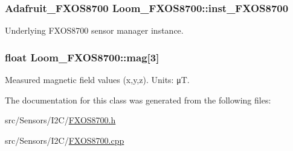 \subsubsection[{\texorpdfstring{inst\+\_\+\+F\+X\+O\+S8700}{inst_FXOS8700}}]{\setlength{\rightskip}{0pt plus 5cm}Adafruit\+\_\+\+F\+X\+O\+S8700 Loom\+\_\+\+F\+X\+O\+S8700\+::inst\+\_\+\+F\+X\+O\+S8700\hspace{0.3cm}{\ttfamily [protected]}}\hypertarget{class_loom___f_x_o_s8700_ad3ff453ce86ac6fb61d8109b89877f7b}{}\label{class_loom___f_x_o_s8700_ad3ff453ce86ac6fb61d8109b89877f7b}


Underlying F\+X\+O\+S8700 sensor manager instance. 

\subsubsection[{\texorpdfstring{mag}{mag}}]{\setlength{\rightskip}{0pt plus 5cm}float Loom\+\_\+\+F\+X\+O\+S8700\+::mag\mbox{[}3\mbox{]}\hspace{0.3cm}{\ttfamily [protected]}}\hypertarget{class_loom___f_x_o_s8700_af4ac468c842d26be3d1ef3ed3a67644f}{}\label{class_loom___f_x_o_s8700_af4ac468c842d26be3d1ef3ed3a67644f}


Measured magnetic field values (x,y,z). Units\+: μT. 



The documentation for this class was generated from the following files\+:\begin{DoxyCompactItemize}
\item 
src/\+Sensors/\+I2\+C/\hyperlink{_f_x_o_s8700_8h}{F\+X\+O\+S8700.\+h}\item 
src/\+Sensors/\+I2\+C/\hyperlink{_f_x_o_s8700_8cpp}{F\+X\+O\+S8700.\+cpp}\end{DoxyCompactItemize}

